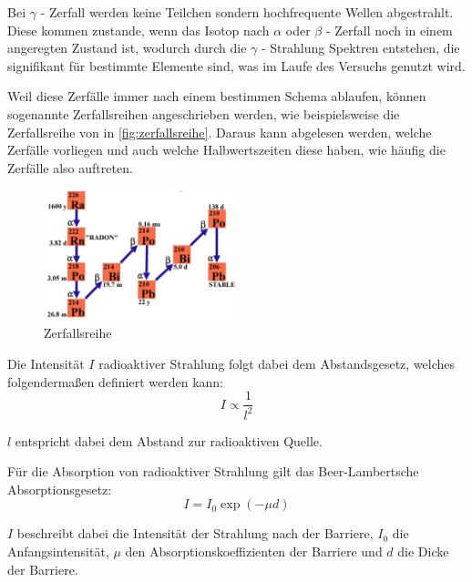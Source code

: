 \documentclass[12pt,english,ngerman]{scrartcl}
\begin{document}
Bei \(\gamma\) - Zerfall werden keine Teilchen sondern hochfrequente Wellen abgestrahlt. Diese kommen zustande,
wenn das Isotop nach \(\alpha\) oder \(\beta\) - Zerfall noch in einem angeregten Zustand ist, wodurch durch die
\(\gamma\) - Strahlung Spektren entstehen, die signifikant für bestimmte Elemente sind, was im Laufe des Versuchs
genutzt wird.


Weil diese Zerfälle immer nach einem bestimmen Schema ablaufen, können sogenannte Zerfallsreihen angeschrieben werden,
wie beispielsweise die Zerfallsreihe von  in \autoref{fig:zerfallsreihe}. Daraus kann abgelesen
werden, welche Zerfälle vorliegen und auch welche Halbwertszeiten diese haben, wie häufig die Zerfälle also auftreten.

\begin{figure}[H]
  \begin{center}
  \includegraphics[width = 0.5\textwidth]{./figures/zerfallsreihe.png}
	
\end{center}
	\caption{Zerfallsreihe ~\cite[]{}}
	\label{fig:zerfallsreihe}

\end{figure}


Die Intensität \(I\) radioaktiver Strahlung folgt dabei dem Abstandsgesetz,
welches folgendermaßen definiert werden kann:
\begin{equation}
  I \propto \frac{1}{l^2}
  \label{eq:abstandsgesetz}
\end{equation}

\(l\) entspricht dabei dem Abstand zur radioaktiven Quelle.

Für die Absorption von radioaktiver Strahlung gilt das Beer-Lambertsche
Absorptionsgesetz:
\begin{equation}
  I = I_0 \exp(-\mu d)
\end{equation}

\(I\) beschreibt dabei die Intensität der Strahlung nach der Barriere, \(I_0\)
die Anfangsintensität, \(\mu\) den Absorptionskoeffizienten der Barriere und
\(d\) die Dicke der Barriere.
\end{document}
